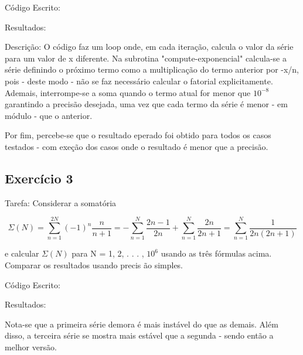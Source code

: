 \documentclass[12pt, a4paper]{article} %
\begin{document}
        C\'odigo Escrito:
        

        Resultados:

        Descri\c{c}\~ao: O c\'odigo faz um loop onde, em cada itera\c{c}\~ao, calcula o valor da s\'erie para um valor de x diferente. Na subrotina "compute-exponencial" calcula-se a s\'erie definindo o pr\'oximo termo como a multiplica\c{c}\~ao do termo anterior por -x/n, pois - deste modo - n\~ao se faz necess\'ario calcular o fatorial explicitamente. Ademais, interrompe-se a soma quando o termo atual for menor que $10^{-8}$ garantindo a precis\~ao desejada, uma vez que cada termo da s\'erie \'e menor - em m\'odulo - que o anterior.

        Por fim, percebe-se que o resultado eperado foi obtido para todos os casos testados - com exe\c{c}\~ao dos casos onde o resultado \'e menor que a precis\~ao.

    \subsection{Exerc\'icio 3}

        Tarefa: Considerar a somat\'oria

        \begin{equation} \Sigma (N) = \sum_{n=1}^{2N} (-1)^n\frac{n}{n+1} = - \sum_{n=1}^N \frac{2n-1}{2n} + \sum_{n=1}^N \frac{2n}{2n+1} = \sum_{n=1}^N \frac{1}{2n(2n+1)} \end{equation}

        e calcular $\Sigma (N)$ para N = 1, 2, . . . , $10^6$ usando as tr\^es f\'ormulas acima. Comparar os resultados usando precis \~ao simples.

        C\'odigo Escrito:
        

        Resultados:

        Nota-se que a primeira s\'erie demora \'e mais inst\'avel do que as demais. Al\'em disso, a terceira s\'erie se mostra mais est\'avel que a segunda - sendo ent\~ao a melhor vers\~ao.
\end{document}
